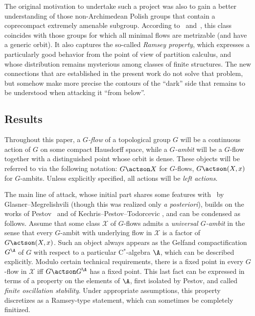 The original motivation to undertake such a project was also to gain a better understanding of those non-Archimedean Polish groups that contain a coprecompact extremely amenable subgroup. According to~\cite{MNT} and~\cite{Z2}, this class coincides with those groups for which all minimal flows are metrizable (and have a generic orbit). It also captures the so-called \emph{Ramsey property}, which expresses a particularly good behavior from the point of view of partition calculus, and whose distribution remains mysterious among classes of finite structures. The new connections that are established in the present work do not solve that problem, but somehow make more precise the contours of the ``dark'' side that remains to be understood when attacking it ``from below''.

\subsection{Results}

Throughout this paper, a \emph{$G$-flow} of a topological group $G$ will be a continuous action of $G$ on some compact Hausdorff space, while a \emph{$G$-ambit} will be a $G$-flow together with a distinguished point whose orbit is dense. These objects will be referred to via the following notation: $G\actson X$ for $G$-flows, $G\actson(X,x)$ for $G$-ambits. Unless explicitly specified, all actions will be \emph{left actions}.

The main line of attack, whose initial part shares some features with~\cite[Section~11]{GlM2} by Glasner--Megrelishvili (though this was realized only \emph{a posteriori}), builds on the works of Pestov~\cite{Pe1, Pe0, Pe} and of Kechris--Pestov--Todorcevic \cite{KPT}, and can be condensed as follows. Assume that some class $\mathcal X$ of $G$-flows admits a \emph{universal $G$-ambit} in the sense that every $G$-ambit with underlying flow in $\mathcal X$ is a factor of $G\actson (X,x)$. Such an object always appears as the Gelfand compactification $G^{\A}$ of $G$ with respect to a particular C$^{*}$-algebra $\A$, which can be described explicitly. Modulo certain technical requirements, there is a fixed point in every $G$-flow in $\mathcal X$ iff $G\actson G^{\A}$ has a fixed point. This last fact can be expressed in terms of a property on the elements of $\A$, first isolated by Pestov, and called \emph{finite oscillation stability}. Under appropriate assumptions, this property discretizes as a Ramsey-type statement, which can sometimes be completely finitized.

